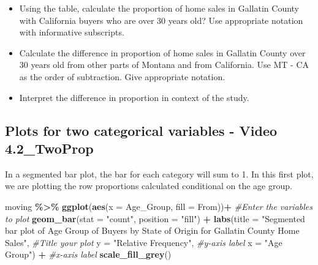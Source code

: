 \documentclass[
]{report}
\newenvironment{Shaded}{\begin{snugshade}}{\end{snugshade}}
\newcommand{\AttributeTok}[1]{\textcolor[rgb]{0.13,0.29,0.53}{#1}}
\newcommand{\CommentTok}[1]{\textcolor[rgb]{0.56,0.35,0.01}{\textit{#1}}}
\newcommand{\FunctionTok}[1]{\textcolor[rgb]{0.13,0.29,0.53}{\textbf{#1}}}
\newcommand{\NormalTok}[1]{#1}
\newcommand{\SpecialCharTok}[1]{\textcolor[rgb]{0.81,0.36,0.00}{\textbf{#1}}}
\newcommand{\StringTok}[1]{\textcolor[rgb]{0.31,0.60,0.02}{#1}}
\providecommand{\tightlist}{%
  \setlength{\itemsep}{0pt}\setlength{\parskip}{0pt}}
\begin{document}
\begin{itemize}
\tightlist
\item
  Using the table, calculate the proportion of home sales in Gallatin County with California buyers who are over 30 years old? Use appropriate notation with informative subscripts.
\end{itemize}

\vspace{0.4in}

\begin{itemize}
\tightlist
\item
  Calculate the difference in proportion of home sales in Gallatin County over 30 years old from other parts of Montana and from California. Use MT - CA as the order of subtraction. Give appropriate notation.
\end{itemize}

\vspace{0.4in}

\begin{itemize}
\tightlist
\item
  Interpret the difference in proportion in context of the study.
\end{itemize}

\vspace{0.5in}

\subsection*{Plots for two categorical variables - Video 4.2\_TwoProp}\label{plots-for-two-categorical-variables---video-4.2_twoprop}

In a segmented bar plot, the bar for each category will sum to 1. In this first plot, we are plotting the row proportions calculated conditional on the age group.

\begin{Shaded}
\begin{Highlighting}[]
\NormalTok{moving }\SpecialCharTok{\%\textgreater{}\%}
  \FunctionTok{ggplot}\NormalTok{(}\FunctionTok{aes}\NormalTok{(}\AttributeTok{x =}\NormalTok{ Age\_Group, }\AttributeTok{fill =}\NormalTok{ From))}\SpecialCharTok{+} \CommentTok{\#Enter the variables to plot}
  \FunctionTok{geom\_bar}\NormalTok{(}\AttributeTok{stat =} \StringTok{"count"}\NormalTok{, }\AttributeTok{position =} \StringTok{"fill"}\NormalTok{) }\SpecialCharTok{+}
  \FunctionTok{labs}\NormalTok{(}\AttributeTok{title =} \StringTok{"Segmented bar plot of Age Group of Buyers by State of}
\StringTok{       Origin for Gallatin County Home Sales"}\NormalTok{,}
       \CommentTok{\#Title your plot}
       \AttributeTok{y =} \StringTok{"Relative Frequency"}\NormalTok{, }\CommentTok{\#y{-}axis label}
       \AttributeTok{x =} \StringTok{"Age Group"}\NormalTok{) }\SpecialCharTok{+} \CommentTok{\#x{-}axis label}
  \FunctionTok{scale\_fill\_grey}\NormalTok{()}
\end{Highlighting}
\end{Shaded}
\end{document}
